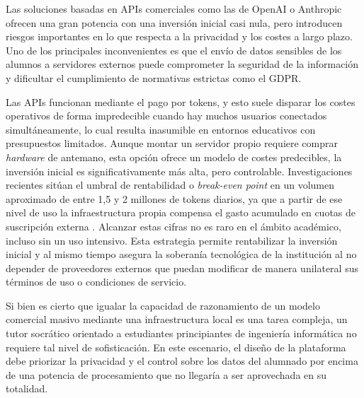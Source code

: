 Las soluciones basadas en APIs comerciales como las de OpenAI o Anthropic ofrecen una gran potencia con una inversión inicial casi nula, pero introducen riesgos importantes en lo que respecta a la privacidad y los costes a largo plazo. Uno de los principales inconvenientes es que el envío de datos sensibles de los alumnos a servidores externos puede comprometer la seguridad de la información y dificultar el cumplimiento de normativas estrictas como el GDPR.

Las APIs funcionan mediante el pago por tokens, y esto suele disparar los costes operativos de forma impredecible cuando hay muchos usuarios conectados simultáneamente, lo cual resulta inasumible en entornos educativos con presupuestos limitados. Aunque montar un servidor propio requiere comprar \textit{hardware} de antemano, esta opción ofrece un modelo de costes predecibles, la inversión inicial es significativamente más alta, pero controlable. Investigaciones recientes sitúan el umbral de rentabilidad o \textit{break-even point} en un volumen aproximado de entre 1,5 y 2 millones de tokens diarios, ya que a partir de ese nivel de uso la infraestructura propia compensa el gasto acumulado en cuotas de suscripción externa \cite{pan2025cost}. Alcanzar estas cifras no es raro en el ámbito académico, incluso sin un uso intensivo. Esta estrategia permite rentabilizar la inversión inicial y al mismo tiempo asegura la soberanía tecnológica de la institución al no depender de proveedores externos que puedan modificar de manera unilateral sus términos de uso o condiciones de servicio.

Si bien es cierto que igualar la capacidad de razonamiento de un modelo comercial masivo mediante una infraestructura local es una tarea compleja, un tutor socrático orientado a estudiantes principiantes de ingeniería informática no requiere tal nivel de sofisticación. En este escenario, el diseño de la plataforma debe priorizar la privacidad y el control sobre los datos del alumnado por encima de una potencia de procesamiento que no llegaría a ser aprovechada en su totalidad.